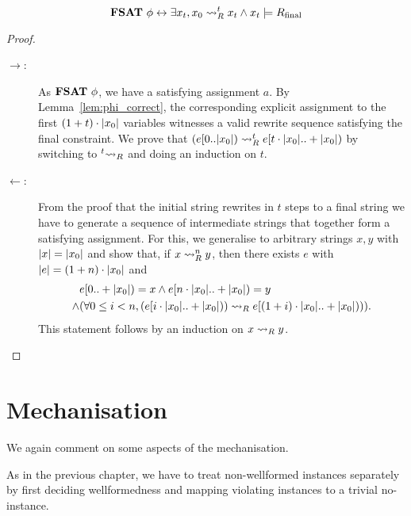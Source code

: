 \begin{theorem}
  \[\textbf{FSAT}~\phi \leftrightarrow \exists x_t, x_0 \rightsquigarrow_{R}^t x_t \land x_t \models R_{\text{final}} \]
\end{theorem}
\begin{proof}\leavevmode
  \begin{description}
    \item[$\rightarrow$:]
      As $\textbf{FSAT}{}~\phi$, we have a satisfying assignment $a$. 
      By Lemma~\ref{lem:phi_correct}, the corresponding explicit assignment to the first $(1 +{t}) \cdot |x_0|$ variables witnesses a valid rewrite sequence satisfying the final constraint. 
      We prove that $(e[0 ..|x_0|) \rightsquigarrow_{R}^t e[t \cdot |x_0| ..+ |x_0|)$ by switching to $\prescript{t}{}{\rightsquigarrow_{R}}$ and doing an induction on $t$.
    \item[$\leftarrow$:]
      From the proof that the initial string rewrites in $t$ steps to a final string we have to generate a sequence of intermediate strings that together form a satisfying assignment. 
      For this, we generalise to arbitrary strings $x, y$ with $|x| = |x_0|$ and show that, if $x \rightsquigarrow_{R}^n y$, then there exists $e$ with $|e| = (1 +{n}) \cdot |x_0|$ and 
      \begin{align*}
        &e[0..+ |x_0|) = x \land e[n \cdot |x_0| ..+ |x_0|) = y \\
        \land & (\forall 0 \le i < n, (e[i \cdot |x_0| ..+ |x_0|)) \rightsquigarrow_{R} e[(1 +{i}) \cdot |x_0| ..+ |x_0|))).
      \end{align*}
      This statement follows by an induction on $x \rightsquigarrow_{R} y$.
  \end{description}
\end{proof}

\section{Mechanisation}
We again comment on some aspects of the mechanisation.

As in the previous chapter, we have to treat non-wellformed instances separately by first deciding wellformedness and mapping violating instances to a trivial no-instance. 

